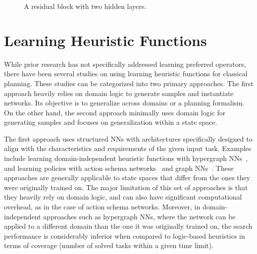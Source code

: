 \documentclass[ppgc,diss,english]{iiufrgs}
\begin{document}
\begin{figure}[tb]
\caption[A residual block]{A residual block with two hidden layers.}
\centering
{}
\label{fig:residual-block}
\end{figure}

\section{Learning Heuristic Functions}
\label{sec:related-h}
While prior research has not specifically addressed learning preferred operators, there have been several studies on using learning heuristic functions for classical planning. These studies can be categorized into two primary approaches.
The first approach heavily relies on domain logic to generate samples and instantiate networks. Its objective is to generalize across domains or a planning formalism.
On the other hand, the second approach minimally uses domain logic for generating samples and focuses on generalization within a state space.

The first approach uses structured NNs with architectures specifically designed to align with the characteristics and requirements of the given input task. Examples include learning domain-independent heuristic functions with hypergraph NNs~\cite{Shen.etal/2020}, and learning policies with action schema networks~\cite{Toyer.etal/2018,Toyer.etal/2020} and graph NNs~\cite{Stahlberg.etal/2022}. These approaches are generally applicable to state spaces that differ from the ones they were originally trained on. The major limitation of this set of approaches is that they heavily rely on domain logic, and can also have significant computational overhead, as in the case of action schema networks. Moreover, in domain-independent approaches such as hypergraph NNs, where the network can be applied to a different domain than the one it was originally trained on, the search performance is considerably inferior when compared to logic-based heuristics in terms of coverage (number of solved tasks within a given time limit).
\end{document}
